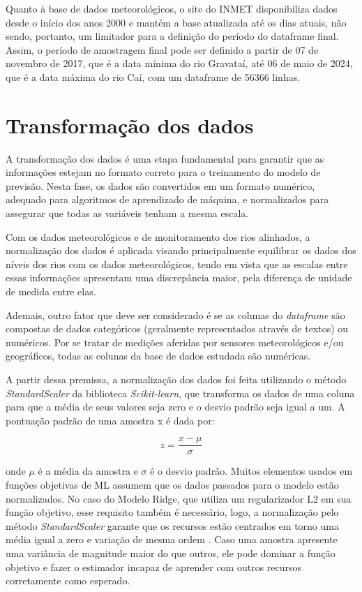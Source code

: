 Quanto à base de dados meteorológicos, o site do INMET disponibiliza dados desde o início dos anos 2000 e mantém a base atualizada até os dias atuais, não sendo, portanto, um limitador para a definição do período do dataframe final. Assim, o período de amostragem final pode ser definido a partir de 07 de novembro de 2017, que é a data mínima do rio Gravataí, até 06 de maio de 2024, que é a data máxima do rio Caí, com um dataframe de 56366 linhas.

\section{Transformação dos dados}
\label{sec:transformacao_dos_dados}

A transformação dos dados é uma etapa fundamental para garantir que as informações estejam no formato correto para o treinamento do modelo de previsão. Nesta fase, os dados são convertidos em um formato numérico, adequado para algoritmos de aprendizado de máquina, e normalizados para assegurar que todas as variáveis tenham a mesma escala.

Com os dados meteorológicos e de monitoramento dos rios alinhados, a normalização dos dados é aplicada visando principalmente equilibrar os dados dos níveis dos rios com os dados meteorológicos, tendo em vista que as escalas entre essas informações apresentam uma discrepância maior, pela diferença de unidade de medida entre elas.

Ademais, outro fator que deve ser considerado é se as colunas do \textit{dataframe} são compostas de dados categóricos (geralmente representados através de textos) ou numéricos. Por se tratar de medições aferidas por sensores meteorológicos e/ou geográficos, todas as colunas da base de dados estudada são numéricas.

A partir dessa premissa, a normalização dos dados foi feita utilizando o método \textit{StandardScaler} da biblioteca \textit{Scikit-learn}, que transforma os dados de uma coluna para que a média de seus valores seja zero e o desvio padrão seja igual a um. A pontuação padrão de uma amostra x é dada por:

\begin{equation}
z = \frac{x - \mu}{\sigma}
\end{equation}

\noindent onde \( \mu \) é a média da amostra e \( \sigma \) é o desvio padrão. Muitos elementos usados em funções objetivas de \gls{ML} assumem que os dados passados para o modelo estão normalizados. No caso do Modelo Ridge, que utiliza um regularizador L2 em sua função objetivo, esse requisito também é necessário, logo, a normalização pelo método \textit{StandardScaler} garante que os recursos estão centrados em torno uma média igual a zero e variação de mesma ordem \cite{scikit_learn_standardscaler}. Caso uma amostra apresente uma variância de magnitude maior do que outros, ele pode dominar a função objetivo e fazer o estimador incapaz de aprender com outros recursos corretamente como esperado.

